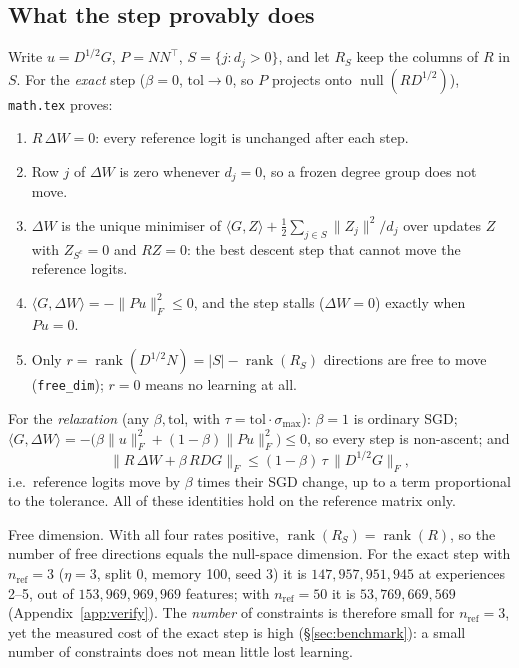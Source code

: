 \documentclass[11pt,a4paper]{article}
\DeclareMathOperator{\Null}{null}
\newcommand{\code}[1]{\texttt{#1}}
\begin{document}
\subsection{What the step provably does}

Write $u=D^{1/2}G$, $P=NN^\top$, $S=\{j:d_j>0\}$, and let $R_S$ keep the columns of $R$ in $S$. For the \emph{exact} step ($\beta=0$, $\text{tol}\to0$, so $P$ projects onto $\Null(RD^{1/2})$), \code{math.tex} proves:
\begin{enumerate}[label=(\alph*)]
\item $R\,\Delta W=0$: every reference logit is unchanged after each step.
\item Row $j$ of $\Delta W$ is zero whenever $d_j=0$, so a frozen degree group does not move.
\item $\Delta W$ is the unique minimiser of $\langle G,Z\rangle+\tfrac12\sum_{j\in S}\|Z_j\|^2/d_j$ over updates $Z$ with $Z_{S^c}=0$ and $RZ=0$: the best descent step that cannot move the reference logits.
\item $\langle G,\Delta W\rangle=-\|Pu\|_F^2\le0$, and the step stalls ($\Delta W=0$) exactly when $Pu=0$.
\item Only $r=\operatorname{rank}(D^{1/2}N)=|S|-\operatorname{rank}(R_S)$ directions are free to move (\code{free\_dim}); $r=0$ means no learning at all.
\end{enumerate}
For the \emph{relaxation} (any $\beta,\text{tol}$, with $\tau=\text{tol}\cdot\sigma_{\max}$): $\beta=1$ is ordinary SGD; $\langle G,\Delta W\rangle=-\bigl(\beta\|u\|_F^2+(1-\beta)\|Pu\|_F^2\bigr)\le0$, so every step is non-ascent; and
\[
\bigl\|R\,\Delta W+\beta\,RDG\bigr\|_F\le(1-\beta)\,\tau\,\|D^{1/2}G\|_F,
\]
i.e.\ reference logits move by $\beta$ times their SGD change, up to a term proportional to the tolerance. All of these identities hold on the reference matrix only.

\begin{verifybox}
Free dimension. With all four rates positive, $\operatorname{rank}(R_S)=\operatorname{rank}(R)$, so the number of free directions equals the null-space dimension. For the exact step with $n_{\text{ref}}=3$ ($\eta=3$, split 0, memory 100, seed 3) it is $147,957,951,945$ at experiences 2--5, out of $153,969,969,969$ features; with $n_{\text{ref}}=50$ it is $53,769,669,569$ (Appendix~\ref{app:verify}). The \emph{number} of constraints is therefore small for $n_{\text{ref}}=3$, yet the measured cost of the exact step is high (\S\ref{sec:benchmark}): a small number of constraints does not mean little lost learning.
\end{verifybox}
\end{document}
